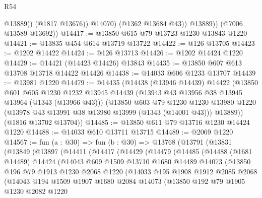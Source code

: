 \begin{lexlean}{R54}
\begin{coremodule}
                    @13889))
                (@1817 @13676))
              @14070)
            (@1362 @13684 @43))
          @13889))
      (@7006 @13589 @13692))
@14417 := @13850 @615 @79 @13723 @1230 @13843 @1220
@14421 := @13835 @454 @614 @13719 @13722
@14422 := @126 @13705
@14423 := @1202 @14422
@14424 := @126 @13713
@14426 := @1202 @14424 @1220
@14429 := @14421 (@14423 @14426) @13843
@14435 := @13850 @607 @613 @13708 @13718 @14422 @14426
@14438 := @14033 @606 @1233 @13707
@14439 := @13981 @1220
@14479 := @14435
    (@14438
      (@13946 @14439)
      @14422
      (@13850
        @601
        @605
        @1230
        @1232
        @13945
        @14439
        (@13943 @43 @13956 @38 @13945 @13964 (@1343 (@13966 @43)))
        (@13850
          @603
          @79
          @1230
          @1230
          @13980
          @1220
          (@13978 @43 @13991 @38 @13980 @13999 (@1343 (@14001 @43)))
          @13889))
      (@1816 @13702 @13704))
@14485 := @13850 @611 @79 @13716 @1230 @14424 @1220
@14488 := @14033 @610 @13711 @13715
@14489 := @2069 @1220
@14567 := fun (a : @30) =>
  fun (b : @30) =>
  @13768
    (@13791
      (@13831
        (@13849
          (@13897
            (@14411
              (@14417
                (@14429
                  (@14479
                    (@14485
                      (@14488
                        (@1681 @14489)
                        @14424
                        (@14043
                          @609
                          @1509
                          @13710
                          @1680
                          @14489
                          @14073
                          (@13850
                            @196
                            @79
                            @1913
                            @1230
                            @2068
                            @1220
                            (@14033
                              @195
                              @1908
                              @1912
                              @2085
                              @2068
                              (@14043
                                @194
                                @1509
                                @1907
                                @1680
                                @2084
                                @14073
                                (@13850
                                  @192
                                  @79
                                  @1905
                                  @1230
                                  @2082
                                  @1220

\end{coremodule}
\end{lexlean}
